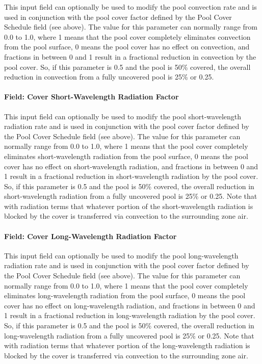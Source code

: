 This input field can optionally be used to modify the pool convection rate and is used in conjunction with the pool cover factor defined by the Pool Cover Schedule field (see above). The value for this parameter can normally range from 0.0 to 1.0, where 1 means that the pool cover completely eliminates convection from the pool surface, 0 means the pool cover has no effect on convection, and fractions in between 0 and 1 result in a fractional reduction in convection by the pool cover. So, if this parameter is 0.5 and the pool is 50\% covered, the overall reduction in convection from a fully uncovered pool is 25\% or 0.25.

\paragraph{Field: Cover Short-Wavelength Radiation Factor}\label{field-cover-short-wavelength-radiation-factor}

This input field can optionally be used to modify the pool short-wavelength radiation rate and is used in conjunction with the pool cover factor defined by the Pool Cover Schedule field (see above). The value for this parameter can normally range from 0.0 to 1.0, where 1 means that the pool cover completely eliminates short-wavelength radiation from the pool surface, 0 means the pool cover has no effect on short-wavelength radiation, and fractions in between 0 and 1 result in a fractional reduction in short-wavelength radiation by the pool cover. So, if this parameter is 0.5 and the pool is 50\% covered, the overall reduction in short-wavelength radiation from a fully uncovered pool is 25\% or 0.25. Note that with radiation terms that whatever portion of the short-wavelength radiation is blocked by the cover is transferred via convection to the surrounding zone air.

\paragraph{Field: Cover Long-Wavelength Radiation Factor}\label{field-cover-long-wavelength-radiation-factor}

This input field can optionally be used to modify the pool long-wavelength radiation rate and is used in conjunction with the pool cover factor defined by the Pool Cover Schedule field (see above). The value for this parameter can normally range from 0.0 to 1.0, where 1 means that the pool cover completely eliminates long-wavelength radiation from the pool surface, 0 means the pool cover has no effect on long-wavelength radiation, and fractions in between 0 and 1 result in a fractional reduction in long-wavelength radiation by the pool cover. So, if this parameter is 0.5 and the pool is 50\% covered, the overall reduction in long-wavelength radiation from a fully uncovered pool is 25\% or 0.25. Note that with radiation terms that whatever portion of the long-wavelength radiation is blocked by the cover is transferred via convection to the surrounding zone air.

